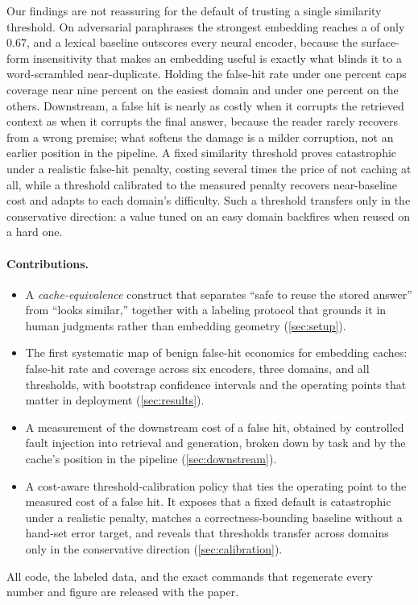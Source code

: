 Our findings are not reassuring for the default of trusting a single similarity threshold.
On adversarial paraphrases the strongest embedding reaches a \rocauc{} of only $0.67$, and a
lexical baseline outscores every neural encoder, because the surface-form insensitivity that
makes an embedding useful is exactly what blinds it to a word-scrambled near-duplicate.
Holding the false-hit rate under one percent caps coverage near nine percent on the easiest
domain and under one percent on the others. Downstream, a false hit is nearly as costly when it
corrupts the retrieved context as when it corrupts the final answer, because the reader rarely
recovers from a wrong premise; what softens the damage is a milder corruption, not an earlier
position in the pipeline. A fixed similarity threshold proves
catastrophic under a realistic false-hit penalty, costing several times the price of not
caching at all, while a threshold calibrated to the measured penalty recovers near-baseline
cost and adapts to each domain's difficulty. Such a threshold transfers only in the
conservative direction: a value tuned on an easy domain backfires when reused on a hard one.

\paragraph{Contributions.}
\begin{itemize}
  \item A \emph{cache-equivalence} construct that separates ``safe to reuse the stored
        answer'' from ``looks similar,'' together with a labeling protocol that grounds
        it in human judgments rather than embedding geometry (\cref{sec:setup}).
  \item The first systematic map of benign false-hit economics for embedding caches:
        false-hit rate and coverage across six encoders, three domains, and all
        thresholds, with bootstrap confidence intervals and the operating points that
        matter in deployment (\cref{sec:results}).
  \item A measurement of the downstream cost of a false hit, obtained by controlled
        fault injection into retrieval and generation, broken down by task and by the
        cache's position in the pipeline (\cref{sec:downstream}).
  \item A cost-aware threshold-calibration policy that ties the operating point to the
        measured cost of a false hit. It exposes that a fixed default is catastrophic under a
        realistic penalty, matches a correctness-bounding baseline without a hand-set error
        target, and reveals that thresholds transfer across domains only in the conservative
        direction (\cref{sec:calibration}).
\end{itemize}

All code, the labeled data, and the exact commands that regenerate every number and
figure are released with the paper.
